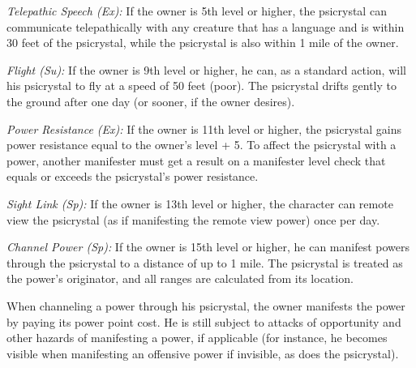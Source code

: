 \textit{Telepathic Speech (Ex):} If the owner is 5th level or higher, the psicrystal can communicate telepathically with any creature that has a language and is within 30 feet of the psicrystal, while the psicrystal is also within 1 mile of the owner.

\textit{Flight (Su):} If the owner is 9th level or higher, he can, as a standard action, will his psicrystal to fly at a speed of 50 feet (poor). The psicrystal drifts gently to the ground after one day (or sooner, if the owner desires).

\textit{Power Resistance (Ex):} If the owner is 11th level or higher, the psicrystal gains power resistance equal to the owner's level + 5. To affect the psicrystal with a power, another manifester must get a result on a manifester level check that equals or exceeds the psicrystal's power resistance.

\textit{Sight Link (Sp):} If the owner is 13th level or higher, the character can remote view the psicrystal (as if manifesting the remote view power) once per day.

\textit{Channel Power (Sp):} If the owner is 15th level or higher, he can manifest powers through the psicrystal to a distance of up to 1 mile. The psicrystal is treated as the power's originator, and all ranges are calculated from its location.

When channeling a power through his psicrystal, the owner manifests the power by paying its power point cost. He is still subject to attacks of opportunity and other hazards of manifesting a power, if applicable (for instance, he becomes visible when manifesting an offensive power if invisible, as does the psicrystal).


